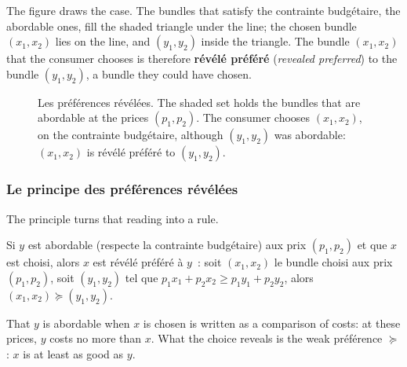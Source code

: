 The figure draws the case. The bundles that satisfy the contrainte budgétaire, the
abordable ones, fill the shaded triangle under the line; the chosen bundle
$(x_1, x_2)$ lies on the line, and $(y_1, y_2)$ inside the triangle. The bundle
$(x_1, x_2)$ that the consumer chooses is therefore \textbf{révélé préféré}
(\textit{revealed preferred}) to the bundle $(y_1, y_2)$, a bundle they could have
chosen.

\begin{figure}[h!]
  \centering
  \caption*{\small Les préférences révélées. The shaded set holds the bundles that
  are abordable at the prices $(p_1, p_2)$. The consumer chooses $(x_1, x_2)$, on
  the contrainte budgétaire, although $(y_1, y_2)$ was abordable: $(x_1, x_2)$ is
  révélé préféré to $(y_1, y_2)$.}
\end{figure}

\subsubsection{Le principe des préférences révélées}

The principle turns that reading into a rule.

\begin{definition}
  Si $y$ est abordable (respecte la contrainte budgétaire) aux prix $(p_1, p_2)$ et
  que $x$ est choisi, alors $x$ est révélé préféré à $y$~: soit $(x_1, x_2)$ le bundle
  choisi aux prix $(p_1, p_2)$, soit $(y_1, y_2)$ tel que
  $p_1 x_1 + p_2 x_2 \ge p_1 y_1 + p_2 y_2$, alors $(x_1, x_2) \succeq (y_1, y_2)$.
\end{definition}

That $y$ is abordable when $x$ is chosen is written as a comparison of costs: at these prices, $y$ costs no more than $x$. What
the choice reveals is the weak préférence $\succeq$: $x$ is at least as good as
$y$.

